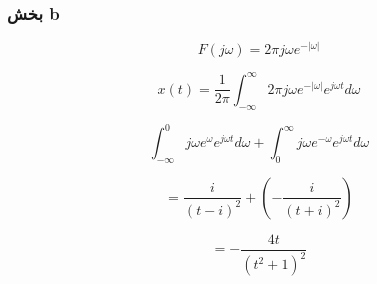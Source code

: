 \documentclass[12pt]{article}
\begin{document}
\subsubsection{بخش b}

$$F(j\omega) = 2\pi j \omega e^{-|\omega|}$$


$$x(t) =\frac{1}{2\pi}\int_{-\infty}^{\infty} 2\pi j \omega e^{-|\omega|} e^{j \omega t} d \omega$$

$$ \int_{-\infty}^{0} j\omega e^{\omega} e^{j \omega t} d\omega + \int_{0}^{\infty} j\omega e^{-\omega} e^{j\omega t} d\omega$$

$$=\frac{i}{(t-i)^2} +(-\frac{i}{(t+i)^2}) $$

$$=-\frac{4 t}{\left(t^2+1\right)^2}$$
\end{document}
